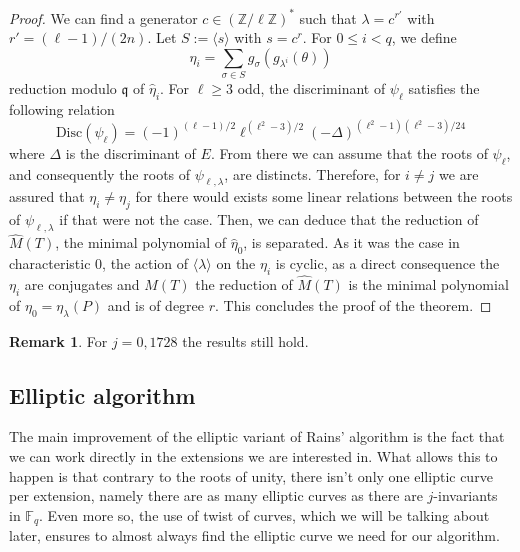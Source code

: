 \documentclass[12pt]{article}
\theoremstyle{plain}
\theoremstyle{definition}
\newtheorem*{remark}{Remark}
\def\Z{\ensuremath{\mathbb{Z}}}
\def\F{\ensuremath{\mathbb{F}}}
\newcounter{algorithm}
\begin{document}
\begin{proof}
We can find a generator $c\in(\Z/\ell\Z)^{\ast}$ such that $\lambda = c^{r'}$
with $r'=(\ell-1)/(2n)$. Let $S:=\langle{s}\rangle$ with $s=c^r$. For 
$0\leq i<q$, we define 
\begin{equation}
\eta_i = \sum_{\sigma\in S}{g_{\sigma}(g_{\lambda^i}(\theta))}
\end{equation}
reduction modulo $\mathfrak{q}$ of $\widehat{\eta}_i$. For $\ell\geq3$ odd, the
discriminant of $\psi_\ell$ satisfies the following relation \cite{MiMoScho}
\begin{equation}
\text{Disc}(\psi_\ell)=
(-1)^{(\ell-1)/2}\ell^{(\ell^2-3)/2}(-\Delta)^{(\ell^2-1)(\ell^2-3)/24}
\end{equation}
where $\Delta$ is the discriminant of $E$. From there we can assume that the
roots of $\psi_\ell$, and consequently the roots of $\psi_{\ell,\lambda}$, are
distincts. Therefore, for $i\neq j$ we are assured that $\eta_i\neq\eta_j$ for
there would exists some linear relations between the roots of
$\psi_{\ell,\lambda}$ if that were not the case. Then, we can deduce that the 
reduction of $\widehat{M}(T)$, the minimal polynomial of $\widehat{\eta}_0$, 
is separated. As it was the case in characteristic $0$, the action of 
$\langle{\lambda}\rangle$ on the $\eta_i$ is cyclic, as a direct consequence 
the $\eta_i$ are conjugates and $M(T)$ the reduction of $\widehat{M}(T)$ is 
the minimal polynomial of $\eta_0 = \eta_\lambda(P)$ and is of degree $r$. 
This concludes the proof of the theorem.
\end{proof}

\begin{remark}
For $j=0,1728$ the results still hold. %
\end{remark}

\subsection{Elliptic algorithm}

The main improvement of the elliptic variant of Rains' algorithm is the fact
that we can work directly in the extensions we are interested in. What allows
this to happen is that contrary to the roots of unity, there isn't only one
elliptic curve per extension, namely there are as many elliptic curves as there
are $j$-invariants in $\F_q$. Even more so, the use of twist of curves, which we
will be talking about later, ensures to almost always find the elliptic curve we
need for our algorithm.
\end{document}
